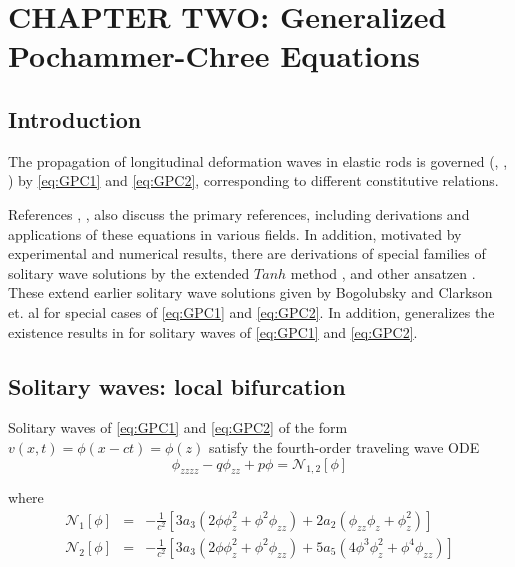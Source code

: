 \chapter{CHAPTER TWO: Generalized Pochammer-Chree Equations} \label{chapter_2}

\section{Introduction}

The propagation of longitudinal deformation waves in elastic rods is governed
(\cite{LCZ}, \cite{Runz}, \cite{WM}) by 
\eqref{eq:GPC1} and \eqref{eq:GPC2},
corresponding to different constitutive relations.

References \cite{LCZ}, \cite{Runz}, \cite{WM} also discuss the primary
references, including derivations and applications of these equations in
various fields. In addition, motivated by experimental and numerical results,
there are derivations of special families of solitary wave solutions by the
extended $Tanh$ method \cite{LCZ}, and other ansatzen \cite{WM}. These extend
earlier solitary wave solutions given by Bogolubsky \cite{Bogo} and Clarkson
et. al \cite{CLVS} for special cases of \eqref{eq:GPC1} and \eqref{eq:GPC2}. In
addition, \cite{Runz} generalizes the existence results in \cite{Sax} for
solitary waves of \eqref{eq:GPC1} and \eqref{eq:GPC2}.  

\section{Solitary waves: local bifurcation}

Solitary waves of \eqref{eq:GPC1} and \eqref{eq:GPC2} of the form 
$v(x,t) = \phi\left(x - c t\right) = \phi\left(z\right)$
 satisfy the fourth-order traveling wave ODE
\begin{equation} \label{eq:ode} \phi_{zzzz} - q \phi_{zz} + p \phi = \mathcal{N}_{1,2}[\phi]
\end{equation}

where 
\begin{subequations}
\begin{eqnarray}
\mathcal{N}_1\left[\phi\right] &=& - \frac{1}{c^2}\left[  3 a_3 \left( 2 \phi \phi_z^2 + \phi^2 \phi_{zz} \right) + 2 a_2\left( \phi_{zz} \phi_z + \phi_z^2\right) \right] \\
\mathcal{N}_2\left[\phi\right] &=& - \frac{1}{c^2}\left[ 3 a_3 \left( 2 \phi \phi_z^2 + \phi^2 \phi_{zz}\right) + 5 a_5 \left( 4 \phi^3 \phi_z^2 + \phi^4 \phi_{zz} \right) \right]
\end{eqnarray}
\end{subequations}

